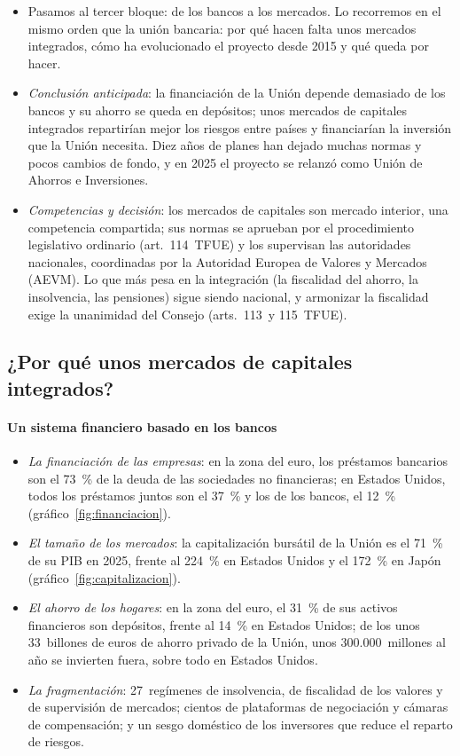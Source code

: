 \documentclass[11pt]{article}
\begin{document}
\begin{itemize}
\item Pasamos al tercer bloque: de los bancos a los mercados. Lo recorremos en el mismo orden que la unión bancaria: por qué hacen falta unos mercados integrados, cómo ha evolucionado el proyecto desde 2015 y qué queda por hacer.
\item \emph{Conclusión anticipada}: la financiación de la Unión depende demasiado de los bancos y su ahorro se queda en depósitos; unos mercados de capitales integrados repartirían mejor los riesgos entre países y financiarían la inversión que la Unión necesita. Diez años de planes han dejado muchas normas y pocos cambios de fondo, y en 2025 el proyecto se relanzó como Unión de Ahorros e Inversiones.
\item \emph{Competencias y decisión}: los mercados de capitales son mercado interior, una competencia compartida; sus normas se aprueban por el procedimiento legislativo ordinario (art.~114~TFUE) y los supervisan las autoridades nacionales, coordinadas por la Autoridad Europea de Valores y Mercados (AEVM). Lo que más pesa en la integración (la fiscalidad del ahorro, la insolvencia, las pensiones) sigue siendo nacional, y armonizar la fiscalidad exige la unanimidad del Consejo (arts.~113~y 115~TFUE).
\end{itemize}

\subsection{¿Por qué unos mercados de capitales integrados?}\label{sec:umc-por-que}

\paragraph{Un sistema financiero basado en los bancos}

\begin{itemize}
\item \emph{La financiación de las empresas}: en la zona del euro, los préstamos bancarios son el 73~\% de la deuda de las sociedades no financieras; en Estados Unidos, todos los préstamos juntos son el 37~\% y los de los bancos, el 12~\% (gráfico~\ref{fig:financiacion}).
\item \emph{El tamaño de los mercados}: la capitalización bursátil de la Unión es el 71~\% de su PIB en 2025, frente al 224~\% en Estados Unidos y el 172~\% en Japón (gráfico~\ref{fig:capitalizacion}).
\item \emph{El ahorro de los hogares}: en la zona del euro, el 31~\% de sus activos financieros son depósitos, frente al 14~\% en Estados Unidos; de los unos 33~billones de euros de ahorro privado de la Unión, unos 300.000~millones al año se invierten fuera, sobre todo en Estados Unidos\nocite{Letta2024Much}.
\item \emph{La fragmentación}: 27~regímenes de insolvencia, de fiscalidad de los valores y de supervisión de mercados; cientos de plataformas de negociación y cámaras de compensación; y un sesgo doméstico de los inversores que reduce el reparto de riesgos.
\end{itemize}
\end{document}
